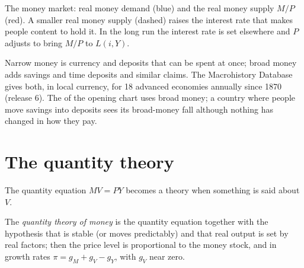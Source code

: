 \begin{omfigure}

{\small The money market: real money demand (blue) and the real money supply
$M/P$ (red). A smaller real money supply (dashed) raises the interest rate that
makes people content to hold it. In the long run the interest rate is set
elsewhere and $P$ adjusts to bring $M/P$ to $L(i, Y)$.}
\end{omfigure}

\begin{measure}
Narrow money is currency and deposits that can be spent at once; broad
money adds savings and time deposits and similar claims. The Macrohistory
Database gives both, in local currency, for 18 advanced economies annually
since 1870 (release 6). %
The  of the opening chart uses broad money; a country where people
move savings into deposits sees its broad-money  fall although
nothing has changed in how they pay.
\end{measure}

\section{The quantity theory}\label{sec:b1:money-and-inflation:quantity}

The quantity equation $MV = PY$ becomes a theory when something is said
about $V$.

\begin{definition}\label{def:b1:money-and-inflation:quantity-theory}
The \emph{quantity theory of money} is the quantity equation together with
the hypothesis that  is stable (or moves predictably) and that real
output is set by real factors; then the price level is proportional to the
money stock, and in growth rates $\pi = g_M + g_V - g_Y$, with $g_V$ near zero.
\end{definition}

